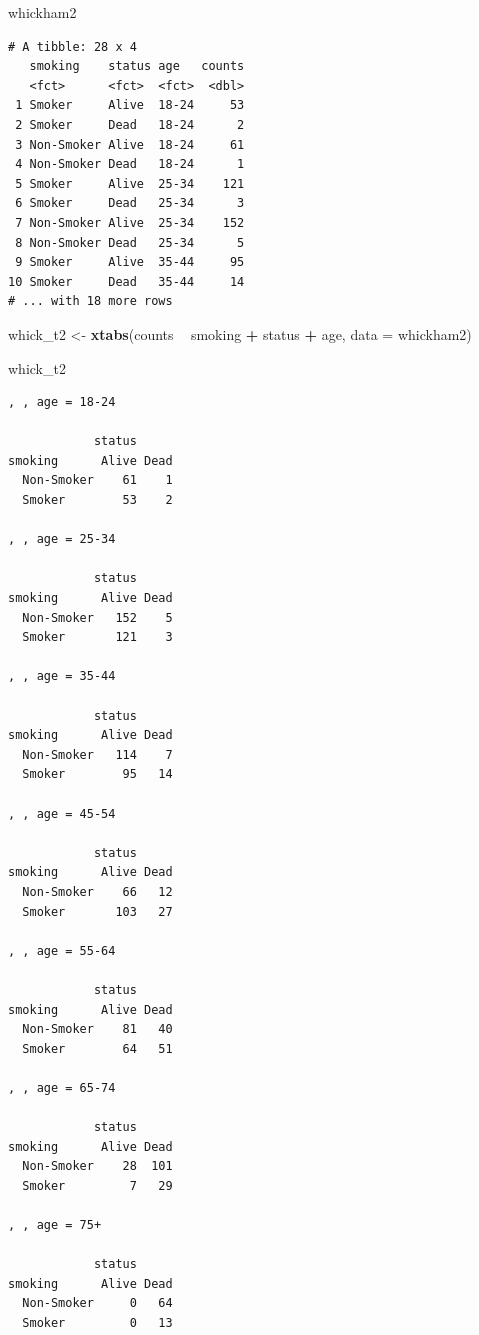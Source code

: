 \documentclass[
]{book}
\newenvironment{Shaded}{\begin{snugshade}}{\end{snugshade}}
\newcommand{\DataTypeTok}[1]{\textcolor[rgb]{0.13,0.29,0.53}{#1}}
\newcommand{\KeywordTok}[1]{\textcolor[rgb]{0.13,0.29,0.53}{\textbf{#1}}}
\newcommand{\NormalTok}[1]{#1}
\newcommand{\OperatorTok}[1]{\textcolor[rgb]{0.81,0.36,0.00}{\textbf{#1}}}
\newcommand{\StringTok}[1]{\textcolor[rgb]{0.31,0.60,0.02}{#1}}
\begin{document}
\begin{Shaded}
\begin{Highlighting}[]
\NormalTok{whickham2}
\end{Highlighting}
\end{Shaded}

\begin{verbatim}
# A tibble: 28 x 4
   smoking    status age   counts
   <fct>      <fct>  <fct>  <dbl>
 1 Smoker     Alive  18-24     53
 2 Smoker     Dead   18-24      2
 3 Non-Smoker Alive  18-24     61
 4 Non-Smoker Dead   18-24      1
 5 Smoker     Alive  25-34    121
 6 Smoker     Dead   25-34      3
 7 Non-Smoker Alive  25-34    152
 8 Non-Smoker Dead   25-34      5
 9 Smoker     Alive  35-44     95
10 Smoker     Dead   35-44     14
# ... with 18 more rows
\end{verbatim}

\begin{Shaded}
\begin{Highlighting}[]
\NormalTok{whick_t2 <-}\StringTok{ }
\StringTok{    }\KeywordTok{xtabs}\NormalTok{(counts }\OperatorTok{~}\StringTok{ }\NormalTok{smoking }\OperatorTok{+}\StringTok{ }\NormalTok{status }\OperatorTok{+}\StringTok{ }\NormalTok{age, }\DataTypeTok{data =}\NormalTok{ whickham2)}

\NormalTok{whick_t2}
\end{Highlighting}
\end{Shaded}

\begin{verbatim}
, , age = 18-24

            status
smoking      Alive Dead
  Non-Smoker    61    1
  Smoker        53    2

, , age = 25-34

            status
smoking      Alive Dead
  Non-Smoker   152    5
  Smoker       121    3

, , age = 35-44

            status
smoking      Alive Dead
  Non-Smoker   114    7
  Smoker        95   14

, , age = 45-54

            status
smoking      Alive Dead
  Non-Smoker    66   12
  Smoker       103   27

, , age = 55-64

            status
smoking      Alive Dead
  Non-Smoker    81   40
  Smoker        64   51

, , age = 65-74

            status
smoking      Alive Dead
  Non-Smoker    28  101
  Smoker         7   29

, , age = 75+

            status
smoking      Alive Dead
  Non-Smoker     0   64
  Smoker         0   13
\end{verbatim}
\end{document}
